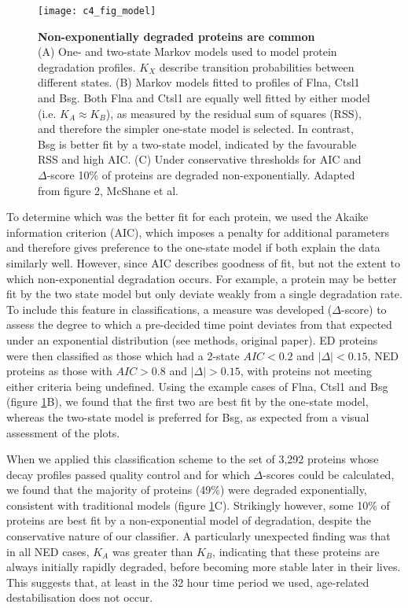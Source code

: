 \documentclass[a4paper,11pt,twoside,openright]{scrbook}
\begin{document}
\begin{figure}[h]
    \texttt{[image: c4\_fig\_model]}
    \caption[Non-exponentially degraded proteins are common]{\sffamily \textbf{Non-exponentially degraded proteins are common} \\ \small (A) One- and two-state Markov models used to model protein degradation profiles. $K_{X}$ describe transition probabilities between different states. (B) Markov models fitted to profiles of Flna, Ctsl1 and Bsg. Both Flna and Ctsl1 are equally well fitted by either model (i.e. $K_{A} \approx K_{B}$), as measured by the residual sum of squares (RSS), and therefore the simpler one-state model is selected. In contrast, Bsg is better fit by a two-state model, indicated by the favourable RSS and high AIC. (C) Under conservative thresholds for AIC and $\Delta$-score 10\% of proteins are degraded non-exponentially. Adapted from figure 2, McShane et al.\cite{McShane2016}}
    \label{figure:model}
\end{figure}

To determine which was the better fit for each protein, we used the Akaike information criterion \cite{Akaike1974} (AIC), which imposes a penalty for additional parameters and therefore gives preference to the one-state model if both explain the data similarly well. However, since AIC describes goodness of fit, but not the extent to which non-exponential degradation occurs. For example, a protein may be better fit by the two state model but only deviate weakly from a single degradation rate. To include this feature in classifications, a measure was developed ($\Delta$-score) to assess the degree to which a pre-decided time point deviates from that expected under an exponential distribution (see methods, original paper). ED proteins were then classified as those which had a 2-state $AIC < 0.2$ and $\lvert \Delta \rvert < 0.15$, NED proteins as those with $AIC > 0.8$ and $\lvert \Delta \rvert > 0.15$, with proteins not meeting either criteria being undefined. Using the example cases of Flna, Ctsl1 and Bsg (figure \ref{figure:model}B), we found that the first two are best fit by the one-state model, whereas the two-state model is preferred for Bsg, as expected from a visual assessment of the plots.

When we applied this classification scheme to the set of 3,292 proteins whose decay profiles passed quality control and for which $\Delta$-scores could be calculated, we found that the majority of proteins (49\%) were degraded exponentially, consistent with traditional models (figure \ref{figure:model}C). Strikingly however, some 10\% of proteins are best fit by a non-exponential model of degradation, despite the conservative nature of our classifier. A particularly unexpected finding was that in all NED cases, $K_{A}$ was greater than $K_{B}$, indicating that these proteins are always initially rapidly degraded, before becoming more stable later in their lives. This suggests that, at least in the 32 hour time period we used, age-related destabilisation does not occur.
\end{document}
